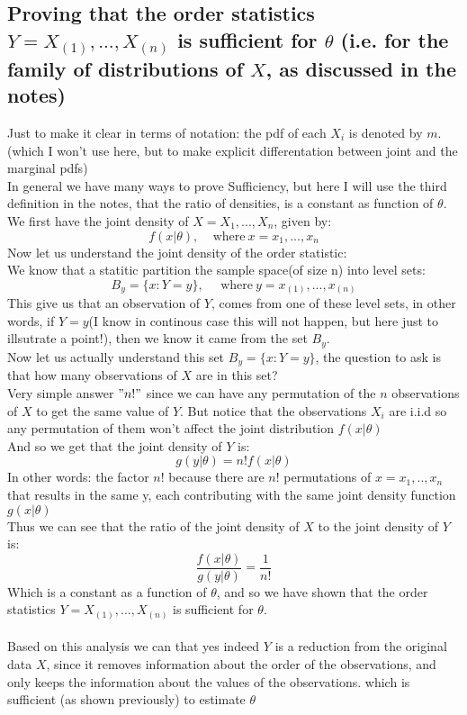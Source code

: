 \documentclass[12pt]{article}
\begin{document}
\subsection*{Proving that the order statistics $Y = X_{(1)}, ..., X_{(n)}$ is sufficient for $\theta$ (i.e. for the family of distributions of $X$, as discussed in the notes)}
Just to make it clear in terms of notation: the pdf of each $X_i$ is denoted by $m$. (which I won't use here, but to make explicit differentation between joint and the marginal pdfs)\\
In general we have many ways to prove Sufficiency, but here I will use the third definition in the notes, that the ratio of densities, is a constant as function of $\theta$.\\ 
We first have the joint density of $X = X_1,...,X_n$, given by: 
\[
f(x|\theta), \ \ \  \ \  \text{where} \ x = x_1,...,x_n
\]
Now let us understand the joint density of the order statistic:\\
We know that a statitic partition the sample space(of size n) into level sets: 
\[
B_y = \{x:Y=y\}, \ \ \ \ \ \ \text{where} \ y = x_{(1)}, ... , x_{(n)}
\]
This give us that an observation of $Y$, comes from one of these level sets, in other words, if $Y=y$(I know in continous case this will not happen, but here just to illsutrate a point!), then we know it came from the set $B_y$. \\ 
Now let us actually understand this set $B_y = \{x:Y=y\}$, the question to ask is that how many observations of $X$ are in this set?\\
Very simple answer $"n!"$ since we can have any permutation of the $n$ observations of $X$ to get the same value of $Y$. But notice that the observations $X_i$ are i.i.d so any permutation of them won't affect the joint distribution $f(x|\theta)$\\
And so we get that the joint density of $Y$ is:
\[
g(y|\theta) = n!f(x|\theta)
\]
In other words: the factor $n!$ because there are $n!$ permutations of $x = x_1,..,x_n$ that results in the same y, each contributing with the same joint density function $g(x|\theta)$\\
Thus we can see that the ratio of the joint density of $X$ to the joint density of $Y$ is:
\[
\frac{f(x|\theta)}{g(y|\theta)} = \frac{1}{n!}
\]
Which is a constant as a function of $\theta$, and so we have shown that the order statistics $Y = X_{(1)}, ..., X_{(n)}$ is sufficient for $\theta$.
\\ \\ 
Based on this analysis we can that yes indeed $Y$ is a reduction from the original data $X$, since it removes information about the order of the observations, and only keeps the information about the values of the observations. which is sufficient (as shown previously) to estimate $\theta$  
\end{document}
